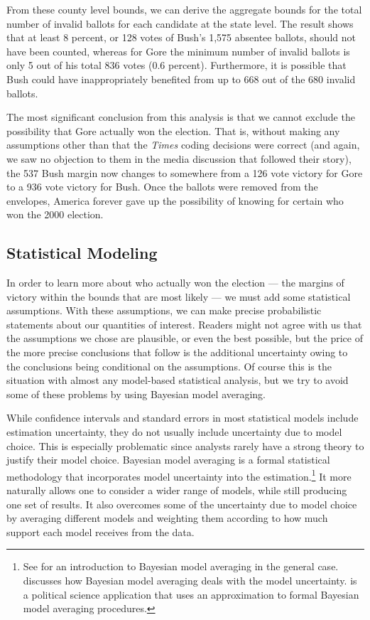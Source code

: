 \documentclass[11pt,titlepage]{article}
\begin{document}
From these county level bounds, we can derive the aggregate bounds for
the total number of invalid ballots for each candidate at the state
level. The result shows that at least 8 percent, or 128 votes of
Bush's 1,575 absentee ballots, should not have been counted, whereas
for Gore the minimum number of invalid ballots is only 5 out of his
total 836 votes (0.6 percent).  Furthermore, it is possible that Bush
could have inappropriately benefited from up to 668 out of the 680
invalid ballots.

The most significant conclusion from this analysis is that we cannot
exclude the possibility that Gore actually won the election.  That is,
without making any assumptions other than that the \emph{Times} coding
decisions were correct (and again, we saw no objection to them in the
media discussion that followed their story), the 537 Bush margin now
changes to somewhere from a 126 vote victory for Gore to a 936 vote
victory for Bush.  Once the ballots were removed from the envelopes,
America forever gave up the possibility of knowing for certain who won
the 2000 election.

\subsection{Statistical Modeling} \label{s:stat}

In order to learn more about who actually won the election --- the
margins of victory within the bounds that are most likely --- we must
add some statistical assumptions.  With these assumptions, we can make
precise probabilistic statements about our quantities of interest.
Readers might not agree with us that the assumptions we chose are
plausible, or even the best possible, but the price of the more
precise conclusions that follow is the additional uncertainty owing to
the conclusions being conditional on the assumptions.  Of course this
is the situation with almost any model-based statistical analysis, but
we try to avoid some of these problems by using Bayesian model
averaging.

While confidence intervals and standard errors in most statistical
models include estimation uncertainty, they do not usually include
uncertainty due to model choice.  This is especially problematic since
analysts rarely have a strong theory to justify their model choice.
Bayesian model averaging is a formal statistical methodology that
incorporates model uncertainty into the estimation.\footnote{See
  \citet{hoet:madi:raft:voli:99} for an introduction to Bayesian model
  averaging in the general case.  \citet{drap:95} discusses how
  Bayesian model averaging deals with the model uncertainty.
  \citet{bart:97} is a political science application that uses an
  approximation to formal Bayesian model averaging procedures.} It
more naturally allows one to consider a wider range of models, while
still producing one set of results.  It also overcomes some of the
uncertainty due to model choice by averaging different models and
weighting them according to how much support each model receives from
the data.
\end{document}
